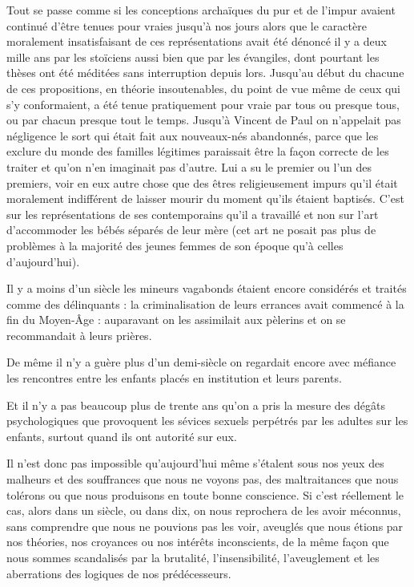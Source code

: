  Tout se passe comme si les conceptions archaïques du pur et de l'impur avaient continué d'être tenues pour vraies jusqu'à nos jours alors que le caractère moralement insatisfaisant de ces représentations avait été dénoncé il y a deux mille ans par les stoïciens aussi bien que par les évangiles, dont pourtant les thèses ont été méditées sans interruption depuis lors. Jusqu'au début du  chacune de ces propositions, en théorie insoutenables, du point de vue même de ceux qui s'y conformaient, a été tenue pratiquement pour vraie par tous ou presque tous, ou par chacun presque tout le temps. Jusqu'à Vincent de Paul on n'appelait pas négligence le sort qui était fait aux nouveaux-nés abandonnés, parce que les exclure du monde des familles légitimes paraissait être la façon correcte de les traiter et qu'on n'en imaginait pas d'autre. Lui a su le premier ou l'un des premiers, voir en eux autre chose que des êtres religieusement impurs qu'il était moralement indifférent de laisser mourir du moment qu'ils étaient baptisés. C'est sur les représentations de ses contemporains qu'il a travaillé et non sur l'art d'accommoder les bébés séparés de leur mère (cet art ne posait pas plus de problèmes à la majorité des jeunes femmes de son époque qu'à celles d'aujourd'hui). 

 Il y a moins d'un siècle les mineurs vagabonds étaient encore considérés et traités comme des délinquants : la criminalisation de leurs errances avait commencé à la fin du Moyen-Âge : auparavant on les assimilait aux pèlerins et on se recommandait à leurs prières. 

 De même il n'y a guère plus d'un demi-siècle on regardait encore avec méfiance les rencontres entre les enfants placés en institution et leurs parents. 

 Et il n'y a pas beaucoup plus de trente ans qu'on a pris la mesure des dégâts psychologiques que provoquent les sévices sexuels perpétrés par les adultes sur les enfants, surtout quand ils ont autorité sur eux. 

 Il n'est donc pas impossible qu'aujourd'hui même s'étalent sous nos yeux des malheurs et des souffrances que nous ne voyons pas, des maltraitances que nous tolérons ou que nous produisons en toute bonne conscience. Si c'est réellement le cas, alors dans un siècle, ou dans dix, on nous reprochera de les avoir méconnus, sans comprendre que nous ne pouvions pas les voir, aveuglés que nous étions par nos théories, nos croyances ou nos intérêts inconscients, de la même façon que nous sommes scandalisés par la brutalité, l'insensibilité, l'aveuglement et les aberrations des logiques de nos prédécesseurs. 


